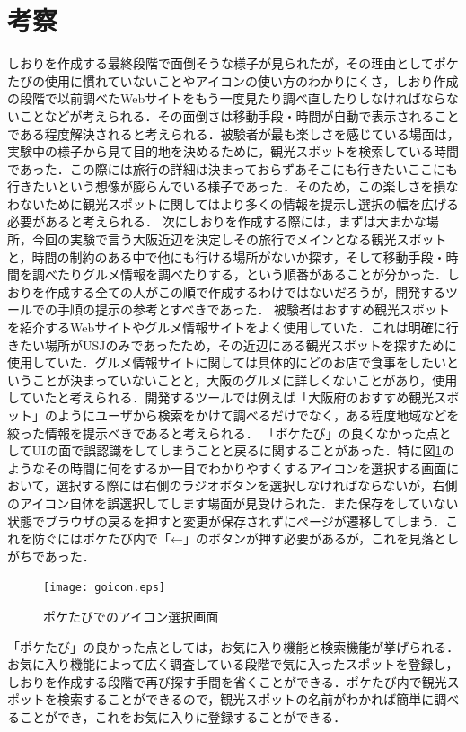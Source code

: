 \documentclass{funthesis}
\begin{document}
\section{考察}
しおりを作成する最終段階で面倒そうな様子が見られたが，その理由としてポケたびの使用に慣れていないことやアイコンの使い方のわかりにくさ，しおり作成の段階で以前調べたWebサイトをもう一度見たり調べ直したりしなければならないことなどが考えられる．その面倒さは移動手段・時間が自動で表示されることである程度解決されると考えられる．被験者が最も楽しさを感じている場面は，実験中の様子から見て目的地を決めるために，観光スポットを検索している時間であった．この際には旅行の詳細は決まっておらずあそこにも行きたいここにも行きたいという想像が膨らんでいる様子であった．そのため，この楽しさを損なわないために観光スポットに関してはより多くの情報を提示し選択の幅を広げる必要があると考えられる．
次にしおりを作成する際には，まずは大まかな場所，今回の実験で言う大阪近辺を決定しその旅行でメインとなる観光スポットと，時間の制約のある中で他にも行ける場所がないか探す，そして移動手段・時間を調べたりグルメ情報を調べたりする，という順番があることが分かった．しおりを作成する全ての人がこの順で作成するわけではないだろうが，開発するツールでの手順の提示の参考とすべきであった．
被験者はおすすめ観光スポットを紹介するWebサイトやグルメ情報サイトをよく使用していた．これは明確に行きたい場所がUSJのみであったため，その近辺にある観光スポットを探すために使用していた．グルメ情報サイトに関しては具体的にどのお店で食事をしたいということが決まっていないことと，大阪のグルメに詳しくないことがあり，使用していたと考えられる．開発するツールでは例えば「大阪府のおすすめ観光スポット」のようにユーザから検索をかけて調べるだけでなく，ある程度地域などを絞った情報を提示べきであると考えられる．
「ポケたび」の良くなかった点としてUIの面で誤認識をしてしまうことと戻るに関することがあった．特に図\ref{Lgoicon}のようなその時間に何をするか一目でわかりやすくするアイコンを選択する画面において，選択する際には右側のラジオボタンを選択しなければならないが，右側のアイコン自体を誤選択してします場面が見受けられた．また保存をしていない状態でブラウザの戻るを押すと変更が保存されずにページが遷移してしまう．これを防ぐにはポケたび内で「←」のボタンが押す必要があるが，これを見落としがちであった．
\begin{figure}[htpb]
\begin{center}
\texttt{[image: goicon.eps]}
\end{center}
\caption{ポケたびでのアイコン選択画面}
\label{Lgoicon}
\end{figure}

「ポケたび」の良かった点としては，お気に入り機能と検索機能が挙げられる．お気に入り機能によって広く調査している段階で気に入ったスポットを登録し，しおりを作成する段階で再び探す手間を省くことができる．ポケたび内で観光スポットを検索することができるので，観光スポットの名前がわかれば簡単に調べることができ，これをお気に入りに登録することができる．
\end{document}
